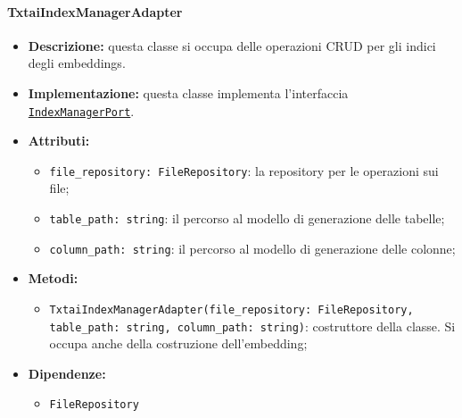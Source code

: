 \paragraph{TxtaiIndexManagerAdapter} \label{TxtaiIndexManagerAdapter}
\begin{itemize}
    \item \textbf{Descrizione:} questa classe si occupa delle operazioni CRUD per gli indici degli embeddings.
    \item \textbf{Implementazione:} questa classe implementa l'interfaccia \hyperref[IndexManagerPort]{\texttt{IndexManagerPort}}.
    \item \textbf{Attributi:}
    \begin{itemize}
        \item \texttt{file\_repository: FileRepository}: la repository per le operazioni sui file;
        \item \texttt{table\_path: string}: il percorso al modello di generazione delle tabelle;
        \item \texttt{column\_path: string}: il percorso al modello di generazione delle colonne;
    \end{itemize}
    \item \textbf{Metodi:}
    \begin{itemize}
        \item \texttt{TxtaiIndexManagerAdapter(file\_repository: FileRepository, table\_path: string, column\_path: string)}: costruttore della classe. Si occupa anche della costruzione dell'embedding;
    \end{itemize}
    \item \textbf{Dipendenze:}
    \begin{itemize}
        \item \texttt{FileRepository}
    \end{itemize}
\end{itemize} 


